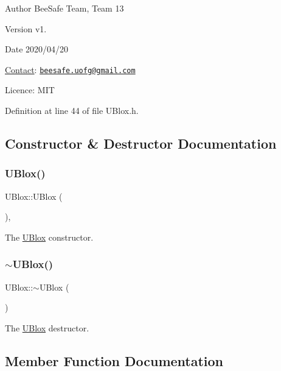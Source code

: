 \begin{DoxyAuthor}{Author}
Bee\+Safe Team, Team 13
\end{DoxyAuthor}
\begin{DoxyVersion}{Version}
v1.
\end{DoxyVersion}
\begin{DoxyDate}{Date}
2020/04/20
\end{DoxyDate}
\hyperlink{class_contact}{Contact}\+: \href{mailto:beesafe.uofg@gmail.com}{\tt beesafe.\+uofg@gmail.\+com}

Licence\+: M\+IT 

Definition at line 44 of file U\+Blox.\+h.



\subsection{Constructor \& Destructor Documentation}
\mbox{\label{class_u_blox_a543adc561cdd98e96a4cdc69fa42bfb6}} 
\subsubsection{\texorpdfstring{U\+Blox()}{UBlox()}}
{\footnotesize\ttfamily U\+Blox\+::\+U\+Blox (\begin{DoxyParamCaption}{ }\end{DoxyParamCaption})\hspace{0.3cm}{\ttfamily [explicit]}, {\ttfamily [default]}}

The \hyperlink{class_u_blox}{U\+Blox} constructor. \mbox{\label{class_u_blox_af4fbdf61c67e715858fd12afb43f96ca}} 
\subsubsection{\texorpdfstring{$\sim$\+U\+Blox()}{~UBlox()}}
{\footnotesize\ttfamily U\+Blox\+::$\sim$\+U\+Blox (\begin{DoxyParamCaption}{ }\end{DoxyParamCaption})\hspace{0.3cm}{\ttfamily [default]}}

The \hyperlink{class_u_blox}{U\+Blox} destructor. 

\subsection{Member Function Documentation}
\mbox{\label{class_u_blox_aab6ad68e4c7522278f19ceab1dc2a58d}} 
